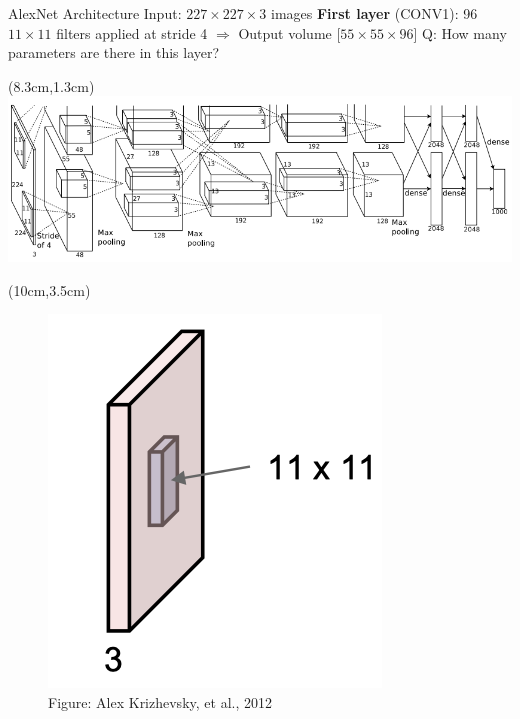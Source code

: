 \documentclass[serif, aspectratio=169]{beamer}
\begin{document}
\begin{frame}{AlexNet Architecture}
	\vspace{1cm}
	Input: $227 \times 227 \times 3$ images \vspace{0.3cm} \newline 
	\textbf{First layer} (CONV1): 96 $11 \times11$ filters applied at stride 4 \newline 
	$\Rightarrow$ Output volume [$55 \times 55 \times 96$] \newline
	\color{blue} Q: How many parameters are there in this layer?
	
	\begin{textblock*}{5cm}(8.3cm,1.3cm) %
	\includegraphics[keepaspectratio, scale=0.25]{pic/alexnet}
	\end{textblock*}
	
	\begin{textblock*}{6cm}(10cm,3.5cm) %
		\begin{figure}
			\centering
			\includegraphics[keepaspectratio, scale=0.25]{pic/cnn_layer2}
			\caption*{\scriptsize{Figure: Alex Krizhevsky, et al., 2012}}
		\end{figure}
	\end{textblock*}
\end{frame}
\end{document}
